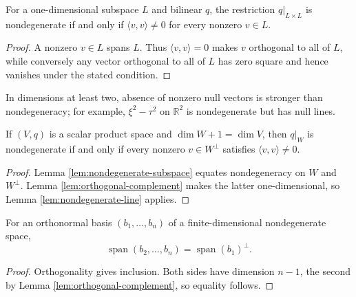 \begin{lemma}
\label{lem:nondegenerate-line}




For a one-dimensional subspace $L$ and bilinear $q$, the restriction $q|_{L\times L}$ is nondegenerate if and only if $\langle v,v\rangle\ne0$ for every nonzero $v\in L$.
\end{lemma}
\begin{proof}

\sketch A nonzero $v\in L$ spans $L$. Thus $\langle v,v\rangle=0$ makes $v$ orthogonal to all of $L$, while conversely any vector orthogonal to all of $L$ has zero square and hence vanishes under the stated condition.
\end{proof}

In dimensions at least two, absence of nonzero null vectors is stronger than nondegeneracy; for example, $\xi^2-\tau^2$ on $\mathbb R^2$ is nondegenerate but has null lines.

\begin{lemma}
\label{lem:hyperplane-nondegenerate}





If $(V,q)$ is a scalar product space and $\dim W+1=\dim V$, then $q|_W$ is nondegenerate if and only if every nonzero $v\in W^\perp$ satisfies $\langle v,v\rangle\ne0$.
\end{lemma}
\begin{proof}

\sketch Lemma \ref{lem:nondegenerate-subspace} equates nondegeneracy on $W$ and $W^\perp$. Lemma \ref{lem:orthogonal-complement} makes the latter one-dimensional, so Lemma \ref{lem:nondegenerate-line} applies.
\end{proof}

\begin{lemma}
\label{lem:orthonormal-tail-spans-orthogonal}





For an orthonormal basis $(b_1,\ldots,b_n)$ of a finite-dimensional nondegenerate space,
\[
\operatorname{span}(b_2,\ldots,b_n)=\operatorname{span}(b_1)^\perp.
\]
\end{lemma}
\begin{proof}

\sketch Orthogonality gives inclusion. Both sides have dimension $n-1$, the second by Lemma \ref{lem:orthogonal-complement}, so equality follows.
\end{proof}

